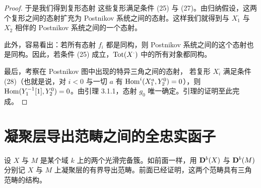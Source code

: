 \begin{proof}
于是我们得到复形态射
这些复形满足条件 (25) 与 (27)。由归纳假设，这两个复形之间的态射扩充为 Postnikov 系统之间的态射。这样我们就得到与 $X_{1}^{\cdot}$ 与 $X_{2}^{\cdot}$ 相伴的 Postnikov 系统之间的一个态射。

此外，容易看出：若所有态射 $f_{i}$ 都是同构，则 Postnikov 系统之间的这个态射也是同构。因此，若条件 (25) 成立，$\operatorname{Tot}(X^{\cdot})$ 中的所有对象都同构。

最后，考察在 Postnikov 图中出现的特异三角之间的态射，
若复形 $X_{i}^{\cdot}$ 满足条件 (28)（也就是说，对 $i<0$ 与一切 $a$ 有 $\operatorname{Hom}^{i}(X_{1}^{a},Y_{2}^{0})=0$），则 $\operatorname{Hom}(Y_{1}^{-1}[1],Y_{2}^{0})=0$。由引理 3.1.1，态射 $g_{0}$ 唯一确定。引理的证明至此完成。
\end{proof}

\section{凝聚层导出范畴之间的全忠实函子}


设 $X$ 与 $M$ 是某个域 $k$ 上的两个光滑完备簇。如前面一样，用 $\mathbf{D}^{b}(X)$ 与 $\mathbf{D}^{b}(M)$ 分别记 $X$ 与 $M$ 上凝聚层的有界导出范畴。前面已经证明，这两个范畴具有三角范畴的结构。

